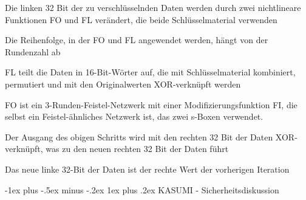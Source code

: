 \documentclass[a4paper]{article}
\makeatletter
\renewcommand{\subsubsection}{\@startsection{subsubsection}{3}{0mm}%
 {-1ex plus -.5ex minus -.2ex}%
 {1ex plus .2ex}%
 {\normalfont\small\bfseries}}
\makeatother
\begin{document}
\begin{multicols}{3}

      \begin{itemize*}
            \item Die linken 32 Bit der zu verschlüsselnden Daten werden durch zwei
            nichtlineare Funktionen FO und FL verändert, die beide
            Schlüsselmaterial verwenden
            \item Die Reihenfolge, in der FO und FL angewendet werden, hängt von der
            Rundenzahl ab
            \item FL teilt die Daten in 16-Bit-Wörter auf, die mit Schlüsselmaterial
            kombiniert, permutiert und mit den Originalwerten XOR-verknüpft werden
            \item FO ist ein 3-Runden-Feistel-Netzwerk mit einer Modifizierungsfunktion
            FI, die selbst ein Feistel-ähnliches Netzwerk ist, das zwei s-Boxen
            verwendet.
            \item Der Ausgang des obigen Schritts wird mit den rechten 32 Bit der Daten
            XOR-verknüpft, was zu den neuen rechten 32 Bit der Daten führt
            \item Das neue linke 32-Bit der Daten ist der rechte Wert der vorherigen
            Iteration
      \end{itemize*}


      \subsubsection{KASUMI -
            Sicherheitsdiskussion}


\end{multicols}
\end{document}

